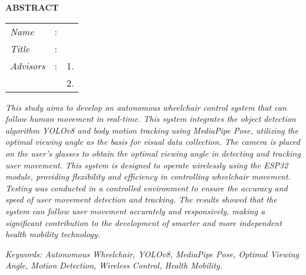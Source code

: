 \begin{center}
  \large\textbf{ABSTRACT}
\end{center}


\vspace{2ex}

\begingroup
\setlength{\tabcolsep}{0pt}

\noindent
\begin{tabularx}{\textwidth}{l >{\centering}m{3em} X}
  \emph{Name}     & : & \name{}         \\

  \emph{Title}    & : & \engtatitle{}   \\

  \emph{Advisors} & : & 1. \advisor{}   \\
                  &   & 2. \coadvisor{} \\
\end{tabularx}
\endgroup

\emph{This study aims to develop an autonomous wheelchair control system that can follow human movement in real-time. This system integrates the object detection algorithm \emph{YOLOv8} and body motion tracking using MediaPipe Pose, utilizing the optimal viewing angle as the basis for visual data collection. The camera is placed on the user's glasses to obtain the optimal viewing angle in detecting and tracking user movement. This system is designed to operate wirelessly using the ESP32 module, providing flexibility and efficiency in controlling wheelchair movement. Testing was conducted in a controlled environment to ensure the accuracy and speed of user movement detection and tracking. The results showed that the system can follow user movement accurately and responsively, making a significant contribution to the development of smarter and more independent health mobility technology.}

\emph{Keywords: Autonomous Wheelchair, YOLOv8, MediaPipe Pose, Optimal Viewing Angle, Motion Detection, Wireless Control, Health Mobility.}
